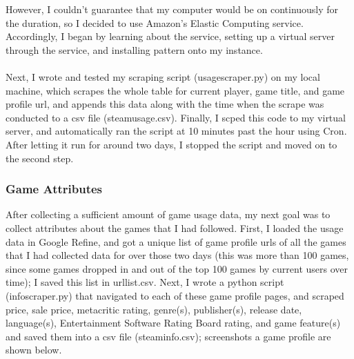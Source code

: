 \documentclass[pdftex,12pt,a4paper]{article}
\begin{document}
However, I couldn't guarantee that my computer would be on continuously for the duration, so I decided to use Amazon's Elastic Computing service. Accordingly, I began by learning about the service, setting up a virtual server through the service, and installing pattern onto my instance. \\ \\

Next, I wrote and tested my scraping script (usagescraper.py) on my local machine, which scrapes the whole table for current player, game title, and game profile url, and appends this data along with the time when the scrape was conducted to a csv file (steamusage.csv). Finally, I scped this code to my virtual server, and automatically ran the script at 10 minutes past the hour using Cron. After letting it run for around two days, I stopped the script and moved on to the second step.
\subsubsection{Game Attributes}
After collecting a sufficient amount of game usage data, my next goal was to collect attributes about the games that I had followed. First, I loaded the usage data in Google Refine, and got a unique list of game profile urls of all the games that I had collected data for over those two days (this was more than 100 games, since some games dropped in and out of the top 100 games by current users over time); I saved this list in urllist.csv. Next, I wrote a python script (infoscraper.py) that navigated to each of these game profile pages, and scraped price, sale price, metacritic rating, genre(s), publisher(s), release date, language(s), Entertainment Software Rating Board rating, and game feature(s) and saved them into a csv file (steaminfo.csv); screenshots a game profile are shown below. \\ \\
\end{document}
